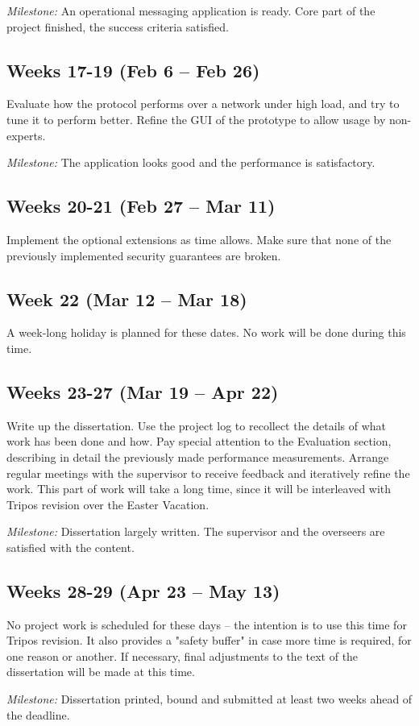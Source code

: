 \documentclass[a4paper, 12pt]{report}
\begin{document}
\begin{appendices}
\vspace{0.7\baselineskip}
\noindent
\textit{Milestone:} An operational messaging application is ready. Core part of the project finished, the success criteria satisfied.


\subsection*{Weeks 17-19 (Feb 6 -- Feb 26)}
Evaluate how the protocol performs over a network under high load, and try to tune it to perform better. Refine the GUI of the prototype to allow usage by non-experts.

\vspace{0.7\baselineskip}
\noindent
\textit{Milestone:} The application looks good and the performance is satisfactory.

\subsection*{Weeks 20-21 (Feb 27 -- Mar 11)}
Implement the optional extensions as time allows. Make sure that none of the previously implemented security guarantees are broken.

\subsection*{Week 22 (Mar 12 -- Mar 18)}
A week-long holiday is planned for these dates. No work will be done during this time.

\subsection*{Weeks 23-27 (Mar 19 -- Apr 22)}
Write up the dissertation. Use the project log to recollect the details of what work has been done and how. Pay special attention to the Evaluation section, describing in detail the previously made performance measurements. Arrange regular meetings with the supervisor to receive feedback and iteratively refine the work. This part of work will take a long time, since it will be interleaved with Tripos revision over the Easter Vacation.

\vspace{0.7\baselineskip}
\noindent
\textit{Milestone:} Dissertation largely written. The supervisor and the overseers are satisfied with the content.

\subsection*{Weeks 28-29 (Apr 23 -- May 13)}
No project work is scheduled for these days -- the intention is to use this time for Tripos revision. It also provides a "safety buffer" in case more time is required, for one reason or another. If necessary, final adjustments to the text of the dissertation will be made at this time.

\vspace{0.7\baselineskip}
\noindent
\textit{Milestone:} Dissertation printed, bound and submitted at least two weeks ahead of the deadline.
\end{appendices}
\end{document}
